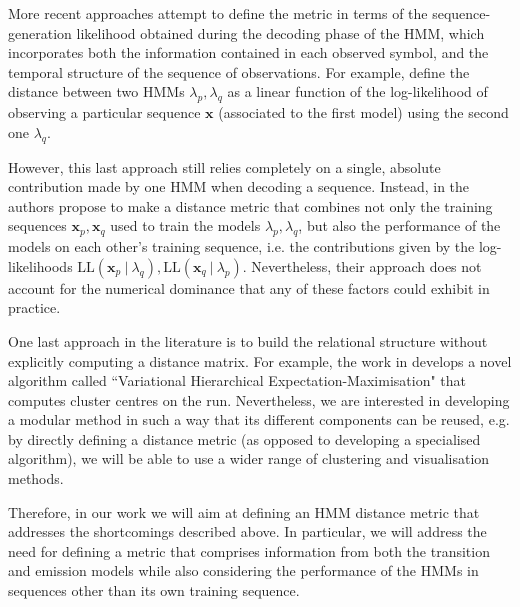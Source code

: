 \documentclass[pdftex,11pt,a4paper]{article}
\theoremstyle{definition}
\theoremstyle{remark}
\newcommand*{\V}[1]{\mathbf{#1}}%
\newcommand\given[1][]{\:#1\vert\:}
\begin{document}
\par More recent approaches attempt to define the metric in terms of the sequence-generation likelihood obtained during the decoding phase of the HMM, which incorporates both the information contained in each observed symbol, and the temporal structure of the sequence of observations. For example, \cite{Bicego,Smyth} define the distance between two HMMs $\lambda_p, \lambda_q$ as a linear function of the log-likelihood of observing a particular sequence $\V{x}$ (associated to the first model) using the second one $\lambda_q$.
\par However, this last approach still relies completely on a single, absolute contribution made by one HMM when decoding a sequence. Instead, in \cite{Porikli2004} the authors propose to make a distance metric that combines not only the training sequences $\V{x}_p, \V{x}_q$ used to train the models $\lambda_p, \lambda_q$, but also the performance of the models on each other's training sequence, i.e. the contributions given by the log-likelihoods $\text{LL}(\V{x}_p \given \lambda_q), \text{LL}(\V{x}_q \given \lambda_p)$. Nevertheless, their approach does not account for the numerical dominance that any of these factors could exhibit in practice.
\par One last approach in the literature is to build the relational structure without explicitly computing a distance matrix. For example, the work in \cite{Coviello2014} develops a novel algorithm called ``Variational Hierarchical Expectation-Maximisation" that computes cluster centres on the run. Nevertheless, we are interested in developing a modular method in such a way that its different components can be reused, e.g. by directly defining a distance metric (as opposed to developing a specialised algorithm), we will be able to use a wider range of clustering and visualisation methods.  
\par Therefore, in our work we will aim at defining an HMM distance metric that addresses the shortcomings described above. In particular, we will address the need for defining a metric that comprises information from both the transition and emission models while also considering the performance of the HMMs in sequences other than its own training sequence.
\end{document}
